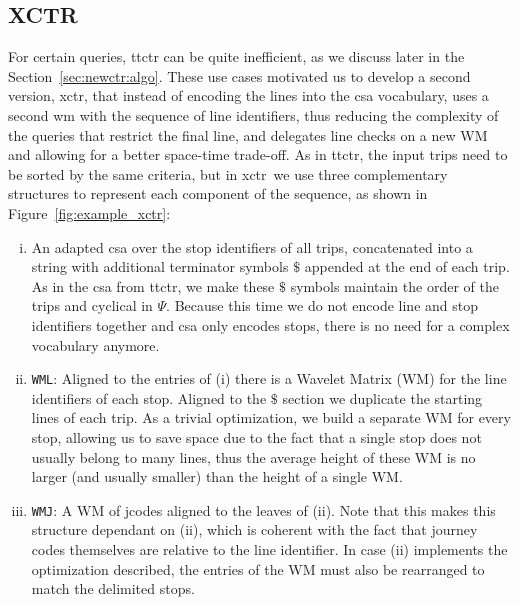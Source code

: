     \subsection{XCTR}
    For certain queries, \gls{ttctr} can be quite inefficient, as we discuss later in the Section~\ref{sec:newctr:algo}. These use cases motivated us to develop a second version, \gls{xctr}, that instead of encoding the lines into the \gls{csa} vocabulary, uses a second \gls{wm} with the sequence of line identifiers, thus reducing the complexity of the queries that restrict the final line, and delegates line checks on a new WM and allowing for a better space-time trade-off. As in \gls{ttctr}, the input trips need to be sorted by the same criteria, but in \gls{xctr}~we use three complementary structures to represent each component of the sequence, as shown in Figure~\ref{fig:example_xctr}:
    \begin{enumerate}[(i)]
        \item An adapted \gls{csa} over the stop identifiers of all trips, concatenated into a string with additional terminator symbols $\$$ appended at the end of each trip. As in the \gls{csa} from \gls{ttctr}, we make these $\$$ symbols maintain the order of the trips and cyclical in $\Psi$. Because this time we do not encode line and stop identifiers together and \gls{csa} only encodes stops, there is no need for a complex vocabulary anymore.
        \item \texttt{WML}: Aligned to the entries of (i) there is a Wavelet Matrix (WM) for the line identifiers of each stop. Aligned to the $\$$ section we duplicate the starting lines of each trip. As a trivial optimization, we build a separate WM for every stop, allowing us to save space due to the fact that a single stop does not usually belong to many lines, thus the average height of these WM is no larger (and usually smaller) than the height of a single WM.
        \item \texttt{WMJ}: A WM of jcodes aligned to the leaves of (ii). Note that this makes this structure dependant on (ii), which is coherent with the fact that journey codes themselves are relative to the line identifier. In case (ii) implements the optimization described, the entries of the WM must also be rearranged to match the delimited stops.
    \end{enumerate}
    

